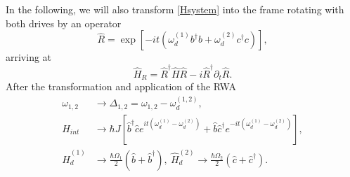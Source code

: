 \documentclass[%
 aps, prx,
 amsmath,amssymb,
 reprint,%
superscriptaddress
]{revtex4-2}
\begin{document}
In the following, we will also transform 
\autoref{Hsystem} into the frame rotating with 
both drives by an operator
\begin{equation}
\hat R = \exp[-i t (\omega_d^{(1)}
b^{\dagger}b+\omega_d^{(2)} 
c^{\dagger}c)],\label{eq:R}
\end{equation}
arriving at
\begin{equation}
\hat H_R = \hat R^{\dagger}\hat H \hat R -	 
{i}\hat R^{\dagger}\partial_t \hat 
R.\label{eq:rotation}
\end{equation}
After the transformation and application of the RWA
\begin{equation}
\begin{aligned}
	\omega_{1,2} &\rightarrow \Delta_{1,2} = \omega_{1,2} - \omega_d^{(1,2)},\\
	\hat H_{int} &\rightarrow \hbar J \left[\hat 
	b^\dag \hat c e^{it(\omega_d^{(1)} - \omega_d^{(2)})} 
	+ \hat b \hat c^\dag e^{-it(\omega_d^{(1)} - 
	\omega_d^{(2)})}\right],\\
	\hat H_{d}^{(1)} &\rightarrow \frac{\hbar \Omega_1}{2}(\hat b  + \hat b^\dag),\ 	\hat H_{d}^{(2)} \rightarrow \frac{\hbar \Omega_2}{2}(\hat c  + \hat c^\dag).
\end{aligned}
\label{eq:RWA}
\end{equation}
\end{document}
